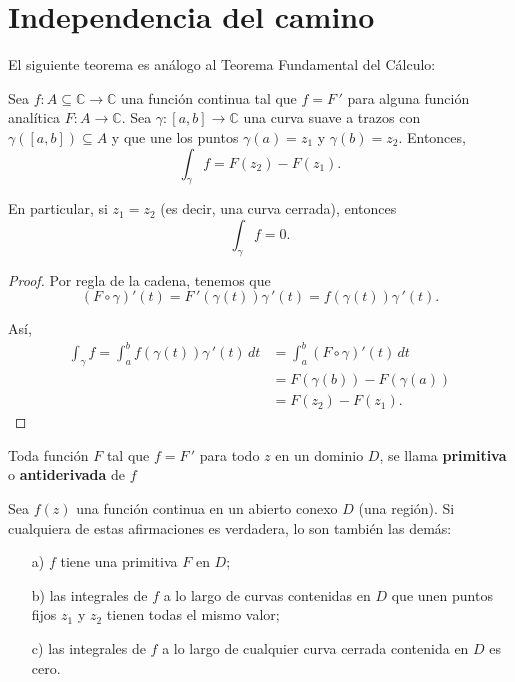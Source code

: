 \section{Independencia del camino}

El siguiente teorema es análogo al Teorema Fundamental del Cálculo:

\begin{teorema} \label{TFClinea}
Sea $f: A \subseteq \mathbb{C} \longrightarrow \mathbb{C}$ una función continua tal que $f = F\,'$ para alguna función analítica $F: A \longrightarrow \mathbb{C}$. Sea $\gamma: [a,b] \longrightarrow \mathbb{C}$ una curva suave a trazos con $\gamma([a,b]) \subseteq A$ y que une los puntos $\gamma(a) = z_1$ y $\gamma(b) = z_2$. Entonces,
$$\int_{\gamma} f = F(z_2) - F(z_1).$$

En particular, si $z_1 = z_2$ (es decir, una curva cerrada), entonces
$$\int_{\gamma} f = 0.$$
\end{teorema}

\begin{proof}
Por regla de la cadena, tenemos que 
$$(F \circ \gamma)'(t) = F\,'(\gamma(t)) \gamma\,'(t) = f(\gamma(t)) \gamma\,'(t).$$

Así,
\begin{align*}
    \int_{\gamma} f = \int_a^b f(\gamma(t)) \gamma\,'(t) \,dt &= \int_a^b (F \circ \gamma)'(t) \,dt \\
    &= F(\gamma(b)) - F(\gamma(a))\\
    &= F(z_2) - F(z_1).
\end{align*} 
\end{proof}

\begin{defi}
Toda función $F$ tal que $f = F\,'$ para todo $z$ en un dominio $D$, se llama \textbf{primitiva} o \textbf{antiderivada} de $f$
\end{defi}

\begin{teorema}  \label{TFC2}
Sea $f(z)$ una función continua en un abierto conexo $D$ (una región). Si cualquiera de estas afirmaciones es verdadera, lo son también las demás:
\begin{itemize}
    \item[a)] $f$ tiene una primitiva $F$ en $D$;
    
    \item[b)] las integrales de $f$ a lo largo de curvas contenidas en $D$ que unen puntos fijos $z_1$ y $z_2$ tienen todas el mismo valor;
    
    \item[c)] las integrales de $f$ a lo largo de cualquier curva cerrada contenida en $D$ es cero.
\end{itemize}
\end{teorema}

